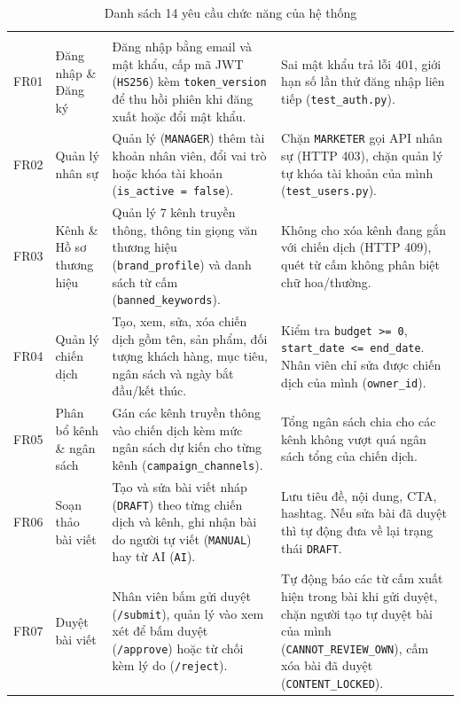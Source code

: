 \begin{small}
\begin{longtable}{|C{0.9cm}|L{2.3cm}|L{4.8cm}|L{5.7cm}|}
\caption{Danh sách 14 yêu cầu chức năng của hệ thống}\label{tab:functional}\\
\hline
{} &  &  & \\
\hline
\endfirsthead
\hline
{} &  &  & \\
\hline
\endhead
\hline
\endfoot
\hline
\endlastfoot
FR01 & Đăng nhập \& Đăng ký & Đăng nhập bằng email và mật khẩu, cấp mã JWT (\texttt{HS256}) kèm \texttt{token\_version} để thu hồi phiên khi đăng xuất hoặc đổi mật khẩu. & Sai mật khẩu trả lỗi 401, giới hạn số lần thử đăng nhập liên tiếp (\texttt{test\_auth.py}).\\
\hline
FR02 & Quản lý nhân sự & Quản lý (\texttt{MANAGER}) thêm tài khoản nhân viên, đổi vai trò hoặc khóa tài khoản (\texttt{is\_active = false}). & Chặn \texttt{MARKETER} gọi API nhân sự (HTTP 403), chặn quản lý tự khóa tài khoản của mình (\texttt{test\_users.py}).\\
\hline
FR03 & Kênh \& Hồ sơ thương hiệu & Quản lý 7 kênh truyền thông, thông tin giọng văn thương hiệu (\texttt{brand\_profile}) và danh sách từ cấm (\texttt{banned\_keywords}). & Không cho xóa kênh đang gắn với chiến dịch (HTTP 409), quét từ cấm không phân biệt chữ hoa/thường.\\
\hline
FR04 & Quản lý chiến dịch & Tạo, xem, sửa, xóa chiến dịch gồm tên, sản phẩm, đối tượng khách hàng, mục tiêu, ngân sách và ngày bắt đầu/kết thúc. & Kiểm tra \texttt{budget >= 0}, \texttt{start\_date <= end\_date}. Nhân viên chỉ sửa được chiến dịch của mình (\texttt{owner\_id}).\\
\hline
FR05 & Phân bổ kênh \& ngân sách & Gán các kênh truyền thông vào chiến dịch kèm mức ngân sách dự kiến cho từng kênh (\texttt{campaign\_channels}). & Tổng ngân sách chia cho các kênh không vượt quá ngân sách tổng của chiến dịch.\\
\hline
FR06 & Soạn thảo bài viết & Tạo và sửa bài viết nháp (\texttt{DRAFT}) theo từng chiến dịch và kênh, ghi nhận bài do người tự viết (\texttt{MANUAL}) hay từ AI (\texttt{AI}). & Lưu tiêu đề, nội dung, CTA, hashtag. Nếu sửa bài đã duyệt thì tự động đưa về lại trạng thái \texttt{DRAFT}.\\
\hline
FR07 & Duyệt bài viết & Nhân viên bấm gửi duyệt (\texttt{/submit}), quản lý vào xem xét để bấm duyệt (\texttt{/approve}) hoặc từ chối kèm lý do (\texttt{/reject}). & Tự động báo các từ cấm xuất hiện trong bài khi gửi duyệt, chặn người tạo tự duyệt bài của mình (\texttt{CANNOT\_REVIEW\_OWN}), cấm xóa bài đã duyệt (\texttt{CONTENT\_LOCKED}).\\

\end{longtable}
\end{small}
